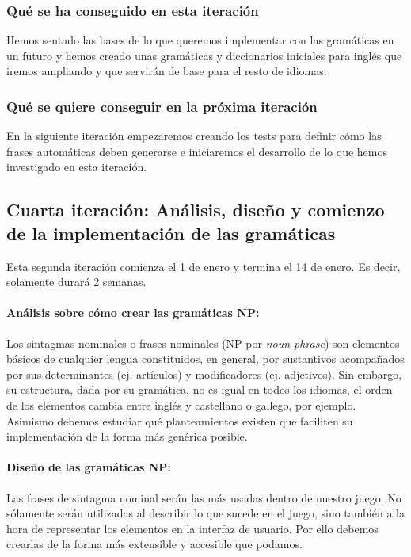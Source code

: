 \subsubsection{Qué se ha conseguido en esta iteración}

Hemos sentado las bases de lo que queremos implementar con las gramáticas en un futuro y hemos creado unas gramáticas y diccionarios iniciales para inglés que iremos ampliando y que servirán de base para el resto de idiomas.

\subsubsection{Qué se quiere conseguir en la próxima iteración}

En la siguiente iteración empezaremos creando los tests para definir cómo las frases automáticas deben generarse e iniciaremos el desarrollo de lo que hemos investigado en esta iteración.

\subsection{Cuarta iteración: Análisis, diseño y comienzo de la implementación de las gramáticas}

Esta segunda iteración comienza el 1 de enero y termina el 14 de enero. Es decir, solamente durará 2 semanas.

\paragraph{Análisis sobre cómo crear las gramáticas NP:} Los sintagmas nominales o frases nominales (NP por \emph{noun phrase}) son elementos básicos de cualquier lengua constituidos, en general, por sustantivos acompañados por sus determinantes (ej. artículos) y modificadores (ej. adjetivos). Sin embargo, su estructura, dada por su gramática, no es igual en todos los idiomas, el orden de los elementos cambia entre inglés y castellano o gallego, por ejemplo. Asimismo debemos estudiar qué planteamientos existen que faciliten su implementación de la forma más genérica posible.

\paragraph{Diseño de las gramáticas NP:} Las frases de sintagma nominal serán las más usadas dentro de nuestro juego. No sólamente serán utilizadas al describir lo que sucede en el juego, sino también a la hora de representar los elementos en la interfaz de usuario. Por ello debemos crearlas de la forma más extensible y accesible que podamos.

